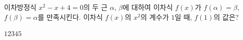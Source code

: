 이차방정식 $x^2-x+4=0$의 두 근 $\alpha$, $\beta$에 대하여 이차식 $f(x)$가 $f(\alpha)=\beta$, $f(\beta)=\alpha$를 만족시킨다. 이차식 $f(x)$의 $x^2$의 계수가 $1$일 때, $f(1)$의 값은?
\begin{choices32}{$1$}{$2$}{$3$}{$4$}{$5$}\end{choices32}
